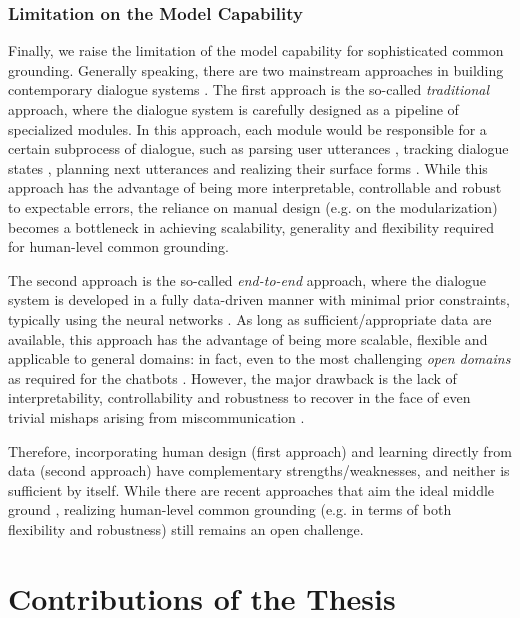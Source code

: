 \subsubsection{Limitation on the Model Capability}

Finally, we raise the limitation of the model capability for sophisticated common grounding. Generally speaking, there are two mainstream approaches in building contemporary dialogue systems \citep{gao2019neural}. The first approach is the so-called \textit{traditional} approach, where the dialogue system is carefully designed as a pipeline of specialized modules. In this approach, each module would be responsible for a certain subprocess of dialogue, such as parsing user utterances \citep{yao2013recurrent}, tracking dialogue states \citep{henderson-etal-2014-word}, planning next utterances \citep{peng-etal-2017-composite} and realizing their surface forms \citep{wen-etal-2015-semantically}. While this approach has the advantage of being more interpretable, controllable and robust to expectable errors, the reliance on manual design (e.g. on the modularization) becomes a bottleneck in achieving scalability, generality and flexibility required for human-level common grounding.

The second approach is the so-called \textit{end-to-end} approach, where the dialogue system is developed in a fully data-driven manner with minimal prior constraints, typically using the neural networks \citep{vinyals2015neural,bordes2017learning}. As long as sufficient/appropriate data are available, this approach has the advantage of being more scalable, flexible and applicable to general domains: in fact, even to the most challenging \textit{open domains} as required for the chatbots \citep{adiwardana2020towards,roller-etal-2021-recipes}. However, the major drawback is the lack of interpretability, controllability and robustness to recover in the face of even trivial mishaps arising from miscommunication \citep{brennan1998grounding,benotti-blackburn-2021-grounding}.

Therefore, incorporating human design (first approach) and learning directly from data (second approach) have complementary strengths/weaknesses, and neither is sufficient by itself. While there are recent approaches that aim the ideal middle ground \citep{williams-etal-2017-hybrid,andreas-etal-2020-task}, realizing human-level common grounding (e.g. in terms of both flexibility and robustness) still remains an open challenge.

\section{Contributions of the Thesis}
\label{01_sec:contributions}

